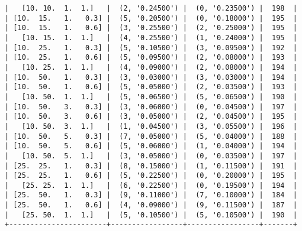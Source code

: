 \documentclass{article}
\begin{document}
\begin{verbatim}
|   [10. 10.  1.  1.]   |  (2, '0.24500') |  (0, '0.23500') |  198  |
| [10.  15.   1.   0.3] |  (5, '0.20500') |  (0, '0.18000') |  195  |
| [10.  15.   1.   0.6] |  (3, '0.25500') |  (2, '0.25000') |  195  |
|   [10. 15.  1.  1.]   |  (4, '0.25500') |  (1, '0.24000') |  195  |
| [10.  25.   1.   0.3] |  (5, '0.10500') |  (3, '0.09500') |  192  |
| [10.  25.   1.   0.6] |  (5, '0.09500') |  (2, '0.08000') |  193  |
|   [10. 25.  1.  1.]   |  (4, '0.09000') |  (2, '0.08000') |  194  |
| [10.  50.   1.   0.3] |  (3, '0.03000') |  (3, '0.03000') |  194  |
| [10.  50.   1.   0.6] |  (5, '0.05000') |  (2, '0.03500') |  193  |
|   [10. 50.  1.  1.]   |  (5, '0.06500') |  (5, '0.06500') |  190  |
| [10.  50.   3.   0.3] |  (3, '0.06000') |  (0, '0.04500') |  197  |
| [10.  50.   3.   0.6] |  (3, '0.05000') |  (2, '0.04500') |  195  |
|   [10. 50.  3.  1.]   |  (1, '0.04500') |  (3, '0.05500') |  196  |
| [10.  50.   5.   0.3] |  (7, '0.05000') |  (5, '0.04000') |  188  |
| [10.  50.   5.   0.6] |  (5, '0.06000') |  (1, '0.04000') |  194  |
|   [10. 50.  5.  1.]   |  (3, '0.05000') |  (0, '0.03500') |  197  |
| [25.  25.   1.   0.3] |  (8, '0.15000') |  (1, '0.11500') |  191  |
| [25.  25.   1.   0.6] |  (5, '0.22500') |  (0, '0.20000') |  195  |
|   [25. 25.  1.  1.]   |  (6, '0.22500') |  (0, '0.19500') |  194  |
| [25.  50.   1.   0.3] |  (9, '0.11000') |  (7, '0.10000') |  184  |
| [25.  50.   1.   0.6] |  (4, '0.09000') |  (9, '0.11500') |  187  |
|   [25. 50.  1.  1.]   |  (5, '0.10500') |  (5, '0.10500') |  190  |
+-----------------------+-----------------+-----------------+-------+
\end{verbatim}
\end{document}
